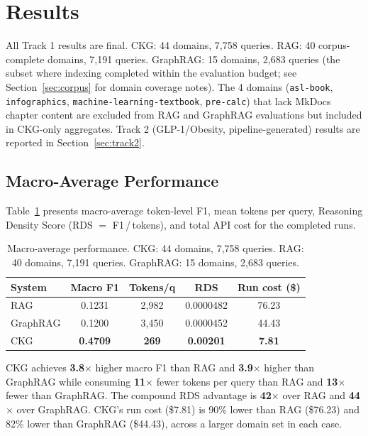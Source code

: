 \section{Results}\label{sec:results}

All Track 1 results are final. CKG: 44 domains, 7,758 queries.
RAG: 40 corpus-complete domains, 7,191 queries. GraphRAG: 15 domains,
2,683 queries (the subset where indexing completed within the evaluation
budget; see Section~\ref{sec:corpus} for domain coverage notes).
The 4 domains (\texttt{asl-book}, \texttt{infographics},
\texttt{machine-learning-textbook}, \texttt{pre-calc}) that lack MkDocs
chapter content are excluded from RAG and GraphRAG evaluations but
included in CKG-only aggregates. Track 2 (GLP-1/Obesity, pipeline-generated)
results are reported in Section~\ref{sec:track2}.

\subsection{Macro-Average Performance}\label{sec:macro}

Table~\ref{tab:macro-results} presents macro-average token-level F1,
mean tokens per query, Reasoning Density Score (RDS $=$ F1\,/\,tokens),
and total API cost for the completed runs.

\begin{table}[htbp]
\centering
\caption{Macro-average performance. CKG: 44 domains, 7,758 queries.
RAG: 40 domains, 7,191 queries. GraphRAG: 15 domains, 2,683 queries.}
\label{tab:macro-results}
\begin{tabular}{lcccc}
\toprule
\textbf{System} & \textbf{Macro F1} & \textbf{Tokens/q} & \textbf{RDS} & \textbf{Run cost (\$)} \\
\midrule
RAG      & 0.1231 & 2{,}982 & 0.0000482  & 76.23 \\
GraphRAG & 0.1200 & 3{,}450 & 0.0000452  & 44.43 \\
CKG      & \textbf{0.4709} & \textbf{269} & \textbf{0.00201} & \textbf{7.81} \\
\bottomrule
\end{tabular}
\end{table}

CKG achieves \textbf{3.8$\times$} higher macro F1 than RAG and
\textbf{3.9$\times$} higher than GraphRAG while consuming \textbf{11$\times$}
fewer tokens per query than RAG and \textbf{13$\times$} fewer than GraphRAG.
The compound RDS advantage is \textbf{42$\times$} over RAG and \textbf{44$\times$}
over GraphRAG. CKG's run cost (\$7.81) is 90\% lower than RAG (\$76.23) and
82\% lower than GraphRAG (\$44.43), across a larger domain set in each case.

